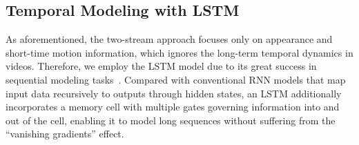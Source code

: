 \documentclass[journal]{IEEEtran}
\begin{document}


\subsection{Temporal Modeling with LSTM}
As aforementioned, the two-stream approach focuses only on appearance and short-time motion information, which ignores the long-term temporal dynamics in videos. Therefore, we employ the LSTM model due to its great success in sequential modeling tasks~\cite{DBLP:conf/icassp/GravesMH13,Donahue2015,Yao2015}. Compared with conventional RNN models that map input data recursively to outputs through hidden states, an LSTM additionally incorporates a memory cell with multiple gates governing information into and out of the cell, enabling it to model long sequences without suffering from the ``vanishing gradients'' effect.
\end{document}
